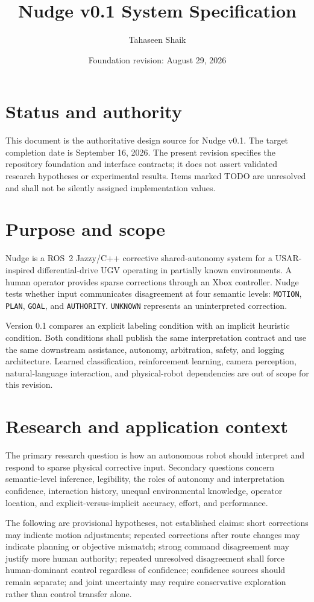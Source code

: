 \documentclass[11pt]{article}
\title{Nudge v0.1 System Specification}
\author{Tahaseen Shaik}
\date{Foundation revision: August 29, 2026}
\begin{document}
\maketitle

\section{Status and authority}
This document is the authoritative design source for Nudge v0.1. The target
completion date is September 16, 2026. The present revision specifies the
repository foundation and interface contracts; it does not assert validated
research hypotheses or experimental results. Items marked TODO are unresolved
and shall not be silently assigned implementation values.

\section{Purpose and scope}
Nudge is a ROS~2 Jazzy/C++ corrective shared-autonomy system for a USAR-inspired
differential-drive UGV operating in partially known environments. A human
operator provides sparse corrections through an Xbox controller. Nudge tests
whether input communicates disagreement at four semantic levels:
\texttt{MOTION}, \texttt{PLAN}, \texttt{GOAL}, and \texttt{AUTHORITY}.
\texttt{UNKNOWN} represents an uninterpreted correction.

Version 0.1 compares an explicit labeling condition with an implicit heuristic
condition. Both conditions shall publish the same interpretation contract and
use the same downstream assistance, autonomy, arbitration, safety, and logging
architecture. Learned classification, reinforcement learning, camera
perception, natural-language interaction, and physical-robot dependencies are
out of scope for this revision.

\section{Research and application context}
The primary research question is how an autonomous robot should interpret and
respond to sparse physical corrective input. Secondary questions concern
semantic-level inference, legibility, the roles of autonomy and interpretation
confidence, interaction history, unequal environmental knowledge, operator
location, and explicit-versus-implicit accuracy, effort, and performance.

The following are provisional hypotheses, not established claims: short
corrections may indicate motion adjustments; repeated corrections after route
changes may indicate planning or objective mismatch; strong command
disagreement may justify more human authority; repeated unresolved disagreement
shall force human-dominant control regardless of confidence; confidence sources
should remain separate; and joint uncertainty may require conservative
exploration rather than control transfer alone.
\end{document}
